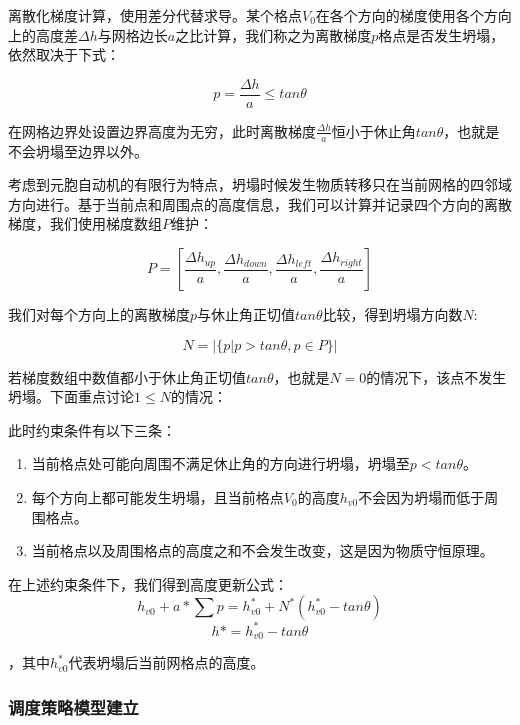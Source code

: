 \documentclass{my_paper}
\begin{document}
离散化梯度计算，使用差分代替求导。某个格点$V_0$在各个方向的梯度使用各个方向上的高度差$\Delta h$与网格边长$a$之比计算，我们称之为离散梯度$p$格点是否发生坍塌，依然取决于下式：

\begin{equation}
    p=\frac{\Delta h}{a}\leq tan\theta
\label{}
\end{equation}

在网格边界处设置边界高度为无穷，此时离散梯度$\frac{\Delta h}{a}$恒小于休止角$tan\theta$，也就是不会坍塌至边界以外。

考虑到元胞自动机的有限行为特点，坍塌时候发生物质转移只在当前网格的四邻域方向进行。基于当前点和周围点的高度信息，我们可以计算并记录四个方向的离散梯度，我们使用梯度数组$P$维护：

\begin{equation}
    P=[\frac{\Delta h_{up}}{a},\frac{\Delta h_{down}}{a},\frac{\Delta h_{left}}{a},\frac{\Delta h_{right}}{a}]
\end{equation}

我们对每个方向上的离散梯度$p$与休止角正切值$tan\theta$比较，得到坍塌方向数$N$:

\begin{equation}
    N=|\{p|p>tan\theta,p\in P\}|
\end{equation}

若梯度数组中数值都小于休止角正切值$tan\theta$，也就是$N=0$的情况下，该点不发生坍塌。下面重点讨论$1 \leq N$的情况：

此时约束条件有以下三条：
\begin{enumerate}
    \item 当前格点处可能向周围不满足休止角的方向进行坍塌，坍塌至$p<tan\theta$。
    \item 每个方向上都可能发生坍塌，且当前格点$V_0$的高度$h_{v0}$不会因为坍塌而低于周围格点。
    \item 当前格点以及周围格点的高度之和不会发生改变，这是因为物质守恒原理。
\end{enumerate}

在上述约束条件下，我们得到高度更新公式：
\begin{equation}
    h_{v0} + a*\sum p =h^*_{v0}+N^*(h^*_{v0}-tan\theta)
\end{equation}
\begin{equation}
    h* = h_{v0}^* -tan\theta
\end{equation}

，其中$h_{v0}^*$代表坍塌后当前网格点的高度。

\subsubsection{调度策略模型建立}
\end{document}
